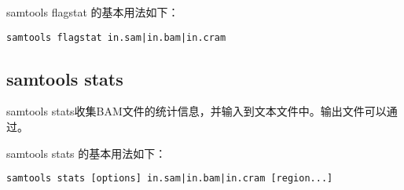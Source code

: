 samtools flagstat 的基本用法如下：
\begin{lstlisting}[style=mycommandBlockStyle]
samtools flagstat in.sam|in.bam|in.cram 
\end{lstlisting}

\subsection{samtools stats}
samtools stats收集BAM文件的统计信息，并输入到文本文件中。输出文件可以通过。

samtools stats 的基本用法如下：
\begin{lstlisting}[style=mycommandBlockStyle]
samtools stats [options] in.sam|in.bam|in.cram [region...] 
\end{lstlisting}

